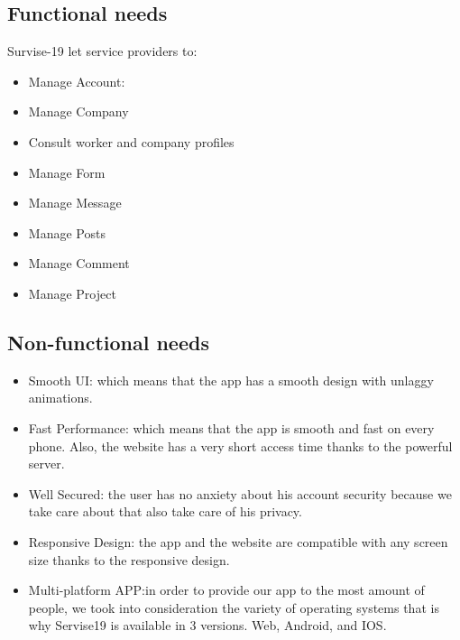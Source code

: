 \documentclass[12pt]{report}
\begin{document}
\subsection{Functional needs}
Survise-19 let service providers to:
\begin{itemize}
 \item Manage Account:
 \item Manage Company
 \item Consult worker and company profiles
   \pagebreak
  \item Manage Form
  \item Manage Message
  \item Manage Posts
  \item Manage Comment
  \item Manage Project
   
  
   


\end{itemize}
\subsection{Non-functional needs}
\begin{itemize}
  \item Smooth UI: which means that the app has a smooth design with unlaggy animations.
  \item Fast Performance: which means that the app is smooth and fast on every phone. Also, the website has a very short access time thanks to the powerful server.
  \item Well Secured: the user has no anxiety about his account security because we take care about that also take care of his privacy.
  \item Responsive Design: the app and the website are compatible with any screen size thanks to the responsive design.
  \item Multi-platform APP:in order to provide our app to the most amount of people, we took into consideration the variety of operating systems that is why Servise19 is available in 3 versions. Web, Android, and IOS.


\setcounter{secnumdepth}{3}
\end{itemize}
\end{document}
